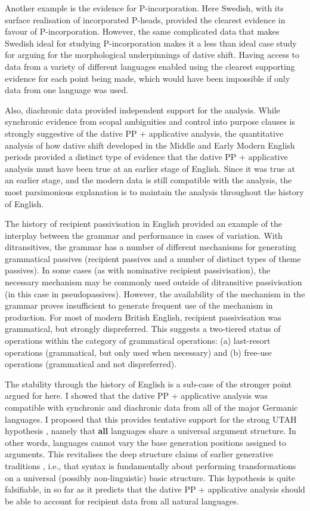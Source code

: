 Another example is the evidence for P-incorporation. Here Swedish, with its surface realisation of incorporated P-heads, provided the clearest evidence in favour of P-incorporation. However, the same complicated data that makes Swedish ideal for studying P-incorporation makes it a less than ideal case study for arguing for the morphological underpinnings of dative shift. Having access to data from a variety of different languages enabled using the clearest supporting evidence for each point being made, which would have been impossible if only data from one language was used.

Also, diachronic data provided independent support for the analysis. While synchronic evidence from scopal ambiguities and control into purpose clauses is strongly suggestive of the dative PP + applicative analysis, the quantitative analysis of how dative shift developed in the Middle and Early Modern English periods provided a distinct type of evidence that the dative PP + applicative analysis must have been true at an earlier stage of English. Since it was true at an earlier stage, and the modern data is still compatible with the analysis, the most parsimonious explanation is to maintain the analysis throughout the history of English.

The history of recipient passivisation in English provided an example of the interplay between the grammar and performance in cases of variation. With ditransitives, the grammar has a number of different mechanisms for generating grammatical passives (recipient passives and a number of distinct types of theme passives). In some cases (as with nominative recipient passivisation), the necessary mechanism may be commonly used outside of ditransitive passivisation (in this case in pseudopassives). However, the availability of the mechanism in the grammar proves insufficient to generate frequent use of the mechanism in production. For most of modern British English, recipient passivisation was grammatical, but strongly dispreferred. This suggests a two-tiered status of operations within the category of grammatical operations: (a) last-resort operations (grammatical, but only used when necessary) and (b) free-use operations (grammatical and not dispreferred).

The stability through the history of English is a sub-case of the stronger point argued for here. I showed that the dative PP + applicative analysis was compatible with synchronic and diachronic data from all of the major Germanic languages. I proposed that this provides tentative support for the strong UTAH hypothesis \citep{Baker.1988}, namely that \textbf{all} languages share a universal argument structure. In other words, languages cannot vary the base generation positions assigned to arguments. This revitalises the deep structure claims of earlier generative traditions \citep{Chomsky.1965,Chomsky.1981}, i.e., that syntax is fundamentally about performing transformations on a universal (possibly non-linguistic) basic structure. This hypothesis is quite falsifiable, in so far as it predicts that the dative PP + applicative analysis should be able to account for recipient data from all natural languages.

